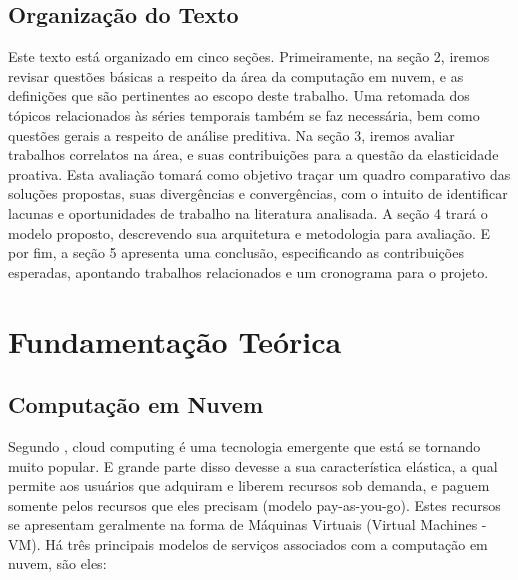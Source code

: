 \documentclass[twoside,english,brazilian]{UNISINOSmonografia}
\begin{document}
\section{Organização do Texto}
Este texto está organizado em cinco seções. Primeiramente, na seção 2, iremos revisar questões básicas a respeito da área da computação em nuvem, e as definições que são pertinentes ao escopo deste trabalho. Uma retomada dos tópicos relacionados às séries temporais também se faz necessária, bem como questões gerais a respeito de análise preditiva. Na seção 3, iremos avaliar trabalhos correlatos na área, e suas contribuições para a questão da elasticidade proativa. Esta avaliação tomará como objetivo traçar um quadro comparativo das soluções propostas, suas divergências e convergências, com o intuito de identificar lacunas e oportunidades de trabalho na literatura analisada. A seção 4 trará o modelo proposto, descrevendo sua arquitetura e metodologia para avaliação. E por fim, a seção 5 apresenta uma conclusão, especificando as contribuições esperadas, apontando trabalhos relacionados e um cronograma para o projeto.


%
%
\chapter{Fundamentação Teórica}

\section{Computação em Nuvem}
Segundo \cite{Lorido-botr2012}, cloud computing é uma tecnologia emergente que está se tornando muito popular. E grande parte disso devesse a sua característica elástica, a qual permite aos usuários que adquiram e liberem recursos sob demanda, e paguem somente pelos recursos que eles precisam (modelo pay-as-you-go). Estes recursos se apresentam geralmente na forma de Máquinas Virtuais (Virtual Machines - VM). Há três principais modelos de serviços associados com a computação em nuvem, são eles:
\end{document}
